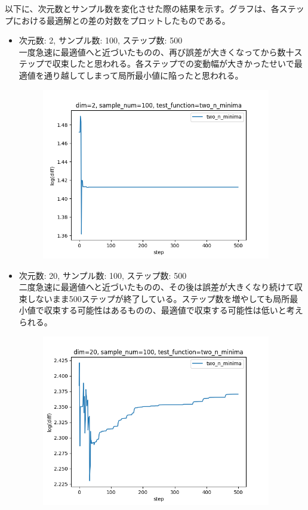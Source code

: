 \documentclass{jsarticle}
\begin{document}
\begin{enumerate}
        以下に、次元数とサンプル数を変化させた際の結果を示す。グラフは、各ステップにおける最適解との差の対数をプロットしたものである。
        \begin {itemize}
            \item 次元数: 2, サンプル数: 100, ステップ数: 500 \\
                一度急速に最適値へと近づいたものの、再び誤差が大きくなってから数十ステップで収束したと思われる。各ステップでの変動幅が大きかったせいで最適値を通り越してしまって局所最小値に陥ったと思われる。 \\
                \begin{figure}[H]
                \includegraphics [width=10cm] {./result/two_n_minima_N_2.png}
                \end{figure}
            \item 次元数: 20, サンプル数: 100, ステップ数: 500 \\
                二度急速に最適値へと近づいたものの、その後は誤差が大きくなり続けて収束しないまま500ステップが終了している。ステップ数を増やしても局所最小値で収束する可能性はあるものの、最適値で収束する可能性は低いと考えられる。 \\
                \begin{figure}[H]
                \includegraphics [width=10cm] {./result/two_n_minima_N_20.png}
                \end{figure}
        \end{itemize}
\end{enumerate}
\end{document}

